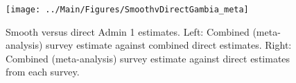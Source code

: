 \documentclass[12pt]{article}\usepackage[]{graphicx}\usepackage[]{color}
\newenvironment{knitrout}{}{} %
\begin{document}



\begin{knitrout}
\color{fgcolor}\begin{figure}[bht]

{\centering \texttt{[image: ../Main/Figures/SmoothvDirectGambia\_meta]} 

}

\caption[Smooth versus direct Admin 1 estimates]{Smooth versus direct Admin 1 estimates. Left: Combined (meta-analysis) survey estimate against combined direct estimates. Right: Combined (meta-analysis) survey estimate against direct estimates from each survey.}\label{fig:unnamed-chunk-133}
\end{figure}


\end{knitrout}
\end{document}

